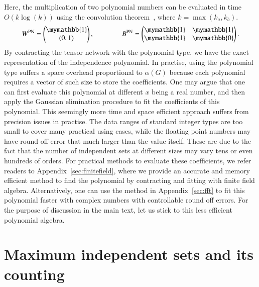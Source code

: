 \documentclass[onefignum, onetabnum]{siamart190516}
\newcommand{\<}{\langle}
\renewcommand{\>}{\rangle}
\newcommand{\App}[1]{Appendix~\ref{#1}}
\begin{document}
Here, the multiplication of two polynomial numbers can be evaluated in time $O(k\log(k))$ using the convolution theorem~\cite{Schonhage1971}, where $k=\max(k_a, k_b)$.
\begin{equation}
    W^{\rm PN} = \left(\begin{matrix}
        \mymathbb{1} \\
        (0,1)
    \end{matrix}\right),   
    \qquad \qquad
        B^{\rm PN} = \left(\begin{matrix}
        \mymathbb{1}  & \mymathbb{1} \\
        \mymathbb{1} & \mymathbb{0}
    \end{matrix}\right).
\end{equation}
By contracting the tensor network with the polynomial type, we have the exact representation of the independence polynomial.
In practise, using the polynomial type suffers a space overhead proportional to $\alpha(G)$ because each polynomial requires a vector of such size to store the coefficients. 
One may argue that one can first evaluate this polynomial at different $x$ being a real number,
and then apply the Gaussian elimination procedure to fit the coefficients of this polynomial.
This seemingly more time and space efficient approach suffers from precision issues in practise.
The data ranges of standard integer types are too small to cover many practical using cases,
while the floating point numbers may have round off error that much larger than the value itself.
These are due to the fact that the number of independent sets at different sizes may vary tens or even hundreds of orders.
For practical methods to evaluate these coefficients, we refer readers to \App{sec:finitefield}, where we provide an accurate and memory efficient method to find the polynomial by contracting and fitting with finite field algebra.
Alternatively, one can use the method in \App{sec:fft} to fit this polynomial faster with complex numbers with controllable round off errors.
For the purpose of discussion in the main text, let us stick to this less efficient polynomial algebra.

\section{Maximum independent sets and its counting}\label{sec:counting}
\end{document}
